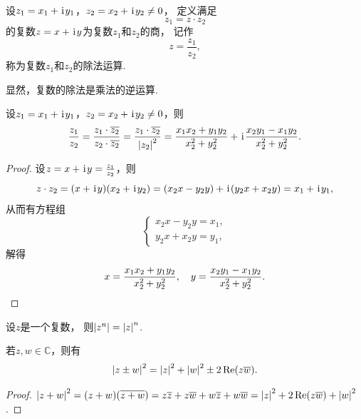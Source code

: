 \begin{definition}%
设\(z_1 = x_1 + \kern1pt\mathrm{i}\kern1pt y_1\)，\(z_2 = x_2 + \kern1pt\mathrm{i}\kern1pt y_2 \neq 0\)，
定义满足\begin{equation*}
z_1 = z \cdot z_2
\end{equation*}的复数\(z = x + \kern1pt\mathrm{i}\kern1pt y\)为复数\(z_1\)和\(z_2\)的商，
记作\begin{equation*}
z = \frac{z_1}{z_2},
\end{equation*}称为复数\(z_1\)和\(z_2\)的除法运算.

显然，复数的除法是乘法的逆运算.
\end{definition}

\begin{theorem}
设\(z_1 = x_1 + \kern1pt\mathrm{i}\kern1pt y_1\)，\(z_2 = x_2 + \kern1pt\mathrm{i}\kern1pt y_2 \neq 0\)，则\begin{equation*}
	\frac{z_1}{z_2}
	= \frac{z_1 \cdot \overline{z_2}}{z_2 \cdot \overline{z_2}}
	= \frac{z_1 \cdot \overline{z_2}}{\abs{z_2}^2}
	= \frac{x_1 x_2 + y_1 y_2}{x_2^2 + y_2^2}
	+ \kern1pt\mathrm{i}\kern1pt \frac{x_2 y_1 - x_1 y_2}{x_2^2 + y_2^2}.
\end{equation*}
\begin{proof}
设\(z = x + \kern1pt\mathrm{i}\kern1pt y = \frac{z_1}{z_2}\)，则\begin{equation*}
	z \cdot z_2 = (x + \kern1pt\mathrm{i}\kern1pt y)(x_2 + \kern1pt\mathrm{i}\kern1pt y_2)
	= (x_2 x - y_2 y) + \kern1pt\mathrm{i}\kern1pt(y_2 x + x_2 y)
	= x_1 + \kern1pt\mathrm{i}\kern1pt y_1,
\end{equation*}
从而有方程组\begin{equation*}
	\left\{ \begin{array}{l}
		x_2 x - y_2 y = x_1, \\
		y_2 x + x_2 y = y_1,
	\end{array} \right.
\end{equation*}
解得\begin{equation*}
	x = \frac{x_1 x_2 + y_1 y_2}{x_2^2 + y_2^2},
	\quad
	y = \frac{x_2 y_1 - x_1 y_2}{x_2^2 + y_2^2}.
	\qedhere
\end{equation*}
\end{proof}
\end{theorem}

\begin{property}
设\(z\)是一个复数，
则\(
	\abs{z^n}
	= \abs{z}^n
\).
\end{property}

\begin{theorem}
若\(z,w \in \mathbb{C}\)，则有\begin{equation}
	\abs{z \pm w}^2
	= \abs{z}^2 + \abs{w}^2 \pm 2 \Re(z \overline{w}).
\end{equation}
\begin{proof}
\(
	\abs{z + w}^2
	= (z + w) (\overline{z + w})
	= z\overline{z}
		+ z\overline{w}
		+ w\overline{z}
		+ w\overline{w}
	= \abs{z}^2 + 2 \Re(z\overline{w}) + \abs{w}^2
\).
\end{proof}
\end{theorem}

